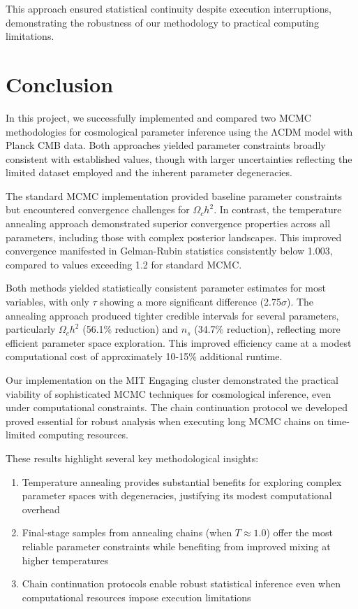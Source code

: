 \documentclass[11pt]{article}
\theoremstyle{definition}
\begin{document}
This approach ensured statistical continuity despite execution interruptions, demonstrating the robustness of our methodology to practical computing limitations.


\section{Conclusion}

In this project, we successfully implemented and compared two MCMC methodologies for cosmological parameter inference using the ΛCDM model with Planck CMB data. Both approaches yielded parameter constraints broadly consistent with established values, though with larger uncertainties reflecting the limited dataset employed and the inherent parameter degeneracies.

The standard MCMC implementation provided baseline parameter constraints but encountered convergence challenges for $\Omega_c h^2$. In contrast, the temperature annealing approach demonstrated superior convergence properties across all parameters, including those with complex posterior landscapes. This improved convergence manifested in Gelman-Rubin statistics consistently below 1.003, compared to values exceeding 1.2 for standard MCMC.

Both methods yielded statistically consistent parameter estimates for most variables, with only $\tau$ showing a more significant difference (2.75$\sigma$). The annealing approach produced tighter credible intervals for several parameters, particularly $\Omega_c h^2$ (56.1\% reduction) and $n_s$ (34.7\% reduction), reflecting more efficient parameter space exploration. This improved efficiency came at a modest computational cost of approximately 10-15\% additional runtime.

Our implementation on the MIT Engaging cluster demonstrated the practical viability of sophisticated MCMC techniques for cosmological inference, even under computational constraints. The chain continuation protocol we developed proved essential for robust analysis when executing long MCMC chains on time-limited computing resources.

These results highlight several key methodological insights:

\begin{enumerate}
    \item Temperature annealing provides substantial benefits for exploring complex parameter spaces with degeneracies, justifying its modest computational overhead
    \item Final-stage samples from annealing chains (when $T\approx1.0$) offer the most reliable parameter constraints while benefiting from improved mixing at higher temperatures
    \item Chain continuation protocols enable robust statistical inference even when computational resources impose execution limitations
\end{enumerate}
\end{document}
